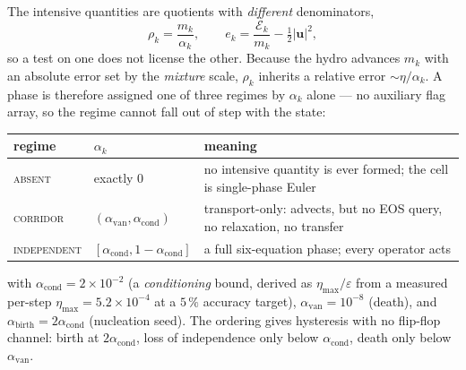 \documentclass[11pt,a4paper]{article}
\newcommand{\uvec}{\mathbf{u}}
\begin{document}
The intensive quantities are quotients with \emph{different} denominators,
\begin{equation}
  \rho_k = \frac{m_k}{\alpha_k},
  \qquad
  e_k = \frac{\mathcal{E}_k}{m_k} - \tfrac12|\uvec|^2,
\end{equation}
so a test on one does not license the other.  Because the hydro advances $m_k$
with an absolute error set by the \emph{mixture} scale, $\rho_k$ inherits a
relative error $\sim\eta/\alpha_k$.  A phase is therefore assigned one of three
regimes by $\alpha_k$ alone --- no auxiliary flag array, so the regime cannot
fall out of step with the state:

\begin{center}
\begin{tabular}{@{}ll>{\raggedright\arraybackslash}p{}@{}}
\toprule
regime & $\alpha_k$ & meaning \\
\midrule
\textsc{absent} & exactly $0$
  & no intensive quantity is ever formed; the cell is single-phase Euler \\
\textsc{corridor} & $(\alpha_{\mathrm{van}},\alpha_{\mathrm{cond}})$
  & transport-only: advects, but no EOS query, no relaxation, no transfer \\
\textsc{independent} & $[\alpha_{\mathrm{cond}},1-\alpha_{\mathrm{cond}}]$
  & a full six-equation phase; every operator acts \\
\bottomrule
\end{tabular}
\end{center}

\noindent
with
$\alpha_{\mathrm{cond}}=2\times10^{-2}$ (a \emph{conditioning} bound, derived as
$\eta_{\max}/\varepsilon$ from a measured per-step $\eta_{\max}=5.2\times10^{-4}$
at a $5\,\%$ accuracy target), $\alpha_{\mathrm{van}}=10^{-8}$ (death), and
$\alpha_{\mathrm{birth}}=2\alpha_{\mathrm{cond}}$ (nucleation seed).  The
ordering gives hysteresis with no flip-flop channel: birth at
$2\alpha_{\mathrm{cond}}$, loss of independence only below
$\alpha_{\mathrm{cond}}$, death only below $\alpha_{\mathrm{van}}$.
\end{document}
